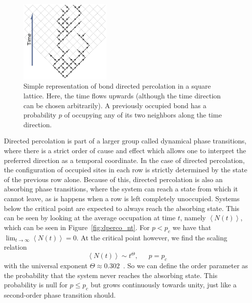 \begin{figure}[t]
\begin{center}
    \includegraphics[width=0.4\textwidth]{chapters/ch5-anis/figs/dperco_scheme}
\end{center}
\caption{Simple representation of bond directed percolation in a square
    lattice. Here, the time flows upwards (although the time direction can be
    chosen arbitrarily). A previously occupied bond has a probability $p$ of
    occupying any of its two neighbors along the time direction.}
\label{fig:dperco_scheme}
\end{figure}

Directed percolation is part of a larger group called dynamical phase
transitions, where there is a strict order of cause and effect which allows one
to interpret the preferred direction as a temporal coordinate. In the case of
directed percolation, the configuration of occupied sites in each row is
strictly determined by the state of the previous row alone. Because of this,
directed percolation is also an absorbing phase transitions, where the system
can reach a state from which it cannot leave, as is happens when a row is left
completely unoccupied. Systems below the critical point are expected to always
reach the absorbing state. This can be seen by looking at the average
occupation at time $t$, namely $\left\langle N(t)\right\rangle$, which can be
seen in Figure~\ref{fig:dperco_nt}. For $p<p_c$ we have that
$\lim_{t\rightarrow\infty}\left\langle N(t)\right\rangle=0$. At the critical
point however, we find the scaling relation
\begin{equation}
    \left\langle N\left(t\right)\right\rangle \sim t^{\Theta},
    \,\,\,\,\,\,\,\,\,
    p=p_c
\end{equation}
with the universal exponent $\Theta\approx0.302$~\cite{Henkel2008}. So we can
define the order parameter as the probability that the system never reaches the
absorbing state. This probability is null for $p\leq p_c$ but grows
continuously towards unity, just like a second-order phase transition should.

